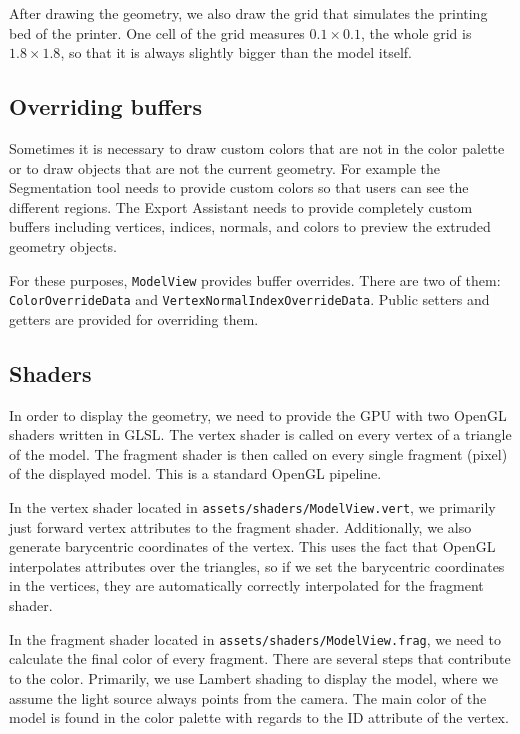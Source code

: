 After drawing the geometry, we also draw the grid that simulates the printing bed of the printer.
One cell of the grid measures $0.1\times{}0.1$, the whole grid is $1.8\times{}1.8$, so that it is always slightly bigger than the model itself.

\subsection{Overriding buffers}

Sometimes it is necessary to draw custom colors that are not in the color palette or to draw objects that are not the current geometry.
For example the Segmentation tool needs to provide custom colors so that users can see the different regions.
The Export Assistant needs to provide completely custom buffers including vertices, indices, normals, and colors to preview the extruded geometry objects.

For these purposes, \texttt{ModelView} provides buffer overrides.
There are two of them: \texttt{ColorOverrideData} and \texttt{VertexNormalIndexOverrideData}.
Public setters and getters are provided for overriding them.

\subsection{Shaders}

In order to display the geometry, we need to provide the GPU with two OpenGL shaders written in GLSL.
The vertex shader is called on every vertex of a triangle of the model.
The fragment shader is then called on every single fragment (pixel) of the displayed model.
This is a standard OpenGL pipeline.

In the vertex shader located in \texttt{assets/shaders/ModelView.vert}, we primarily just forward vertex attributes to the fragment shader.
Additionally, we also generate barycentric coordinates of the vertex.
This uses the fact that OpenGL interpolates attributes over the triangles, so if we set the barycentric coordinates in the vertices, they are automatically correctly interpolated for the fragment shader.

In the fragment shader located in \texttt{assets/shaders/ModelView.frag}, we need to calculate the final color of every fragment.
There are several steps that contribute to the color.
Primarily, we use Lambert shading to display the model, where we assume the light source always points from the camera.
The main color of the model is found in the color palette with regards to the ID attribute of the vertex.


